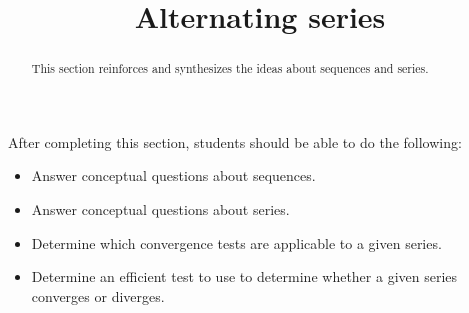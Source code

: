 \documentclass{ximera}
\title{Alternating series}
\begin{document}
\begin{abstract}
This section reinforces and synthesizes the ideas about sequences and series.
\end{abstract}

\maketitle

\begin{sectionOutcomes}

After completing this section, students should be able to do the following:

\begin{itemize}
\item Answer conceptual questions about sequences.
\item Answer conceptual questions about series.
\item Determine which convergence tests are applicable to a given series.
\item Determine an efficient test to use to determine whether a given series converges or diverges.
\end{itemize}

\end{sectionOutcomes}
\end{document}
